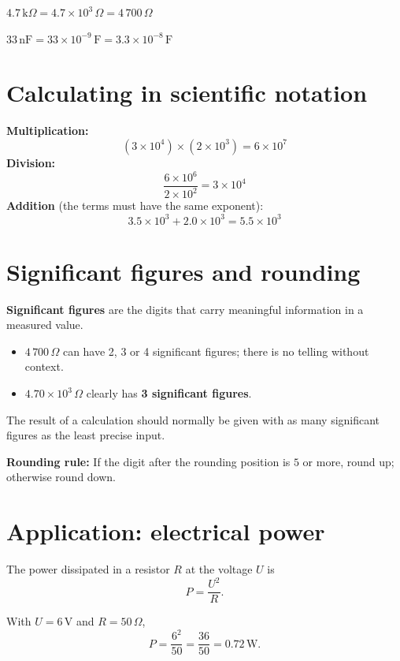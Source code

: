 \begin{exempel}
$4.7\,\text{k}\Omega = 4.7 \times 10^3\,\Omega = 4\,700\,\Omega$
\end{exempel}

\begin{exempel}
$33\,\text{nF} = 33 \times 10^{-9}\,\text{F} = 3.3 \times 10^{-8}\,\text{F}$
\end{exempel}

\section{Calculating in scientific notation}
\label{c5:sec:rakning}
\textbf{Multiplication:}
\[
  (3 \times 10^4) \times (2 \times 10^3) = 6 \times 10^7
\]
\textbf{Division:}
\[
  \frac{6 \times 10^6}{2 \times 10^2} = 3 \times 10^4
\]
\textbf{Addition} (the terms must have the same exponent):
\[
  3.5 \times 10^3 + 2.0 \times 10^3 = 5.5 \times 10^3
\]

\section{Significant figures and rounding}
\label{c5:sec:vardesiffror}
\textbf{Significant figures} are the digits that carry meaningful information in a measured value.
\begin{itemize}
  \item $4\,700\,\Omega$ can have 2, 3 or 4 significant figures; there is no telling without
    context.
  \item $4.70 \times 10^3\,\Omega$ clearly has \textbf{3 significant figures}.
\end{itemize}
The result of a calculation should normally be given with as many significant figures as the
least precise input.

\textbf{Rounding rule:} If the digit after the rounding position is $5$ or more, round up;
otherwise round down.

\section{Application: electrical power}
\label{c5:sec:effekt}
The power dissipated in a resistor $R$ at the voltage $U$ is
\[
  P = \frac{U^2}{R}.
\]

\begin{exempel}
With $U = 6\,\text{V}$ and $R = 50\,\Omega$,
\[
  P = \frac{6^2}{50} = \frac{36}{50} = 0.72\,\text{W}.
\]
\end{exempel}

